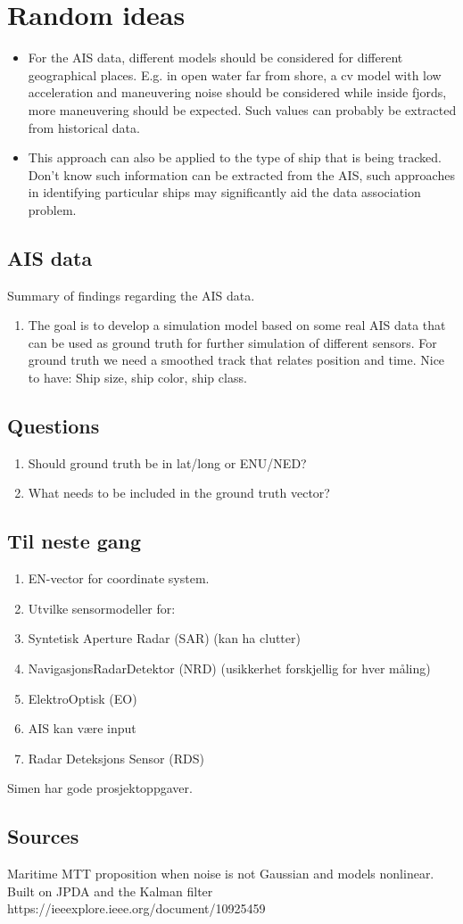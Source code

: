 \section{Random ideas}

\begin{itemize}
    \item For the AIS data, different models should be considered for different geographical places. E.g. in open water far from shore, a cv model with low acceleration and maneuvering noise should be considered while inside fjords, more maneuvering should be expected. Such values can probably be extracted from historical data.
    \item This approach can also be applied to the type of ship that is being tracked. Don't know such information can be extracted from the AIS, such approaches in identifying particular ships may significantly aid the data association problem.
\end{itemize}

\subsection{AIS data}
Summary of findings regarding the AIS data.
\begin{enumerate}
    \item The goal is to develop a simulation model based on some real AIS data that can be used as ground truth for further simulation of different sensors. For ground truth we need a smoothed track that relates position and time. Nice to have: Ship size, ship color, ship class.
\end{enumerate}

\subsection{Questions}
\begin{enumerate}
    \item Should ground truth be in lat/long or ENU/NED?
    \item What needs to be included in the ground truth vector?
\end{enumerate}

\subsection{Til neste gang}
\begin{enumerate}
    \item EN-vector for coordinate system.
    \item Utvilke sensormodeller for: 
    \item Syntetisk Aperture Radar (SAR) (kan ha clutter)
    \item NavigasjonsRadarDetektor (NRD) (usikkerhet forskjellig for hver måling) 
    \item ElektroOptisk (EO)
    \item AIS kan være input
    \item Radar Deteksjons Sensor (RDS)
\end{enumerate}

Simen har gode prosjektoppgaver.

\subsection{Sources}
Maritime MTT proposition when noise is not Gaussian and models nonlinear. Built on JPDA and the Kalman filter
https://ieeexplore.ieee.org/document/10925459

